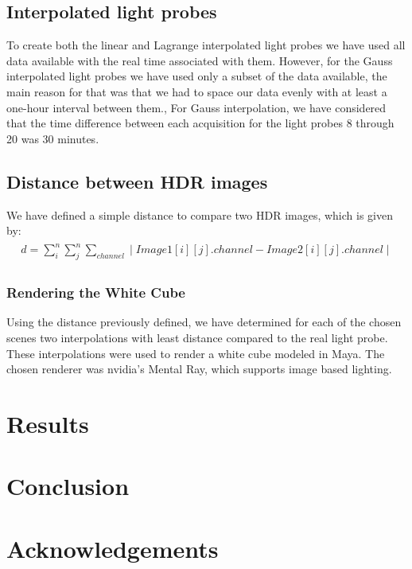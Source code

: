 \documentclass[conference]{acmsiggraph}
\begin{document}
\subsection{Interpolated light probes}
	To create both the linear and Lagrange interpolated light probes we have used all data available with the real time associated with them. 
However, for the Gauss interpolated light probes we have used only a subset of the data available, the main reason for that was that we had to space our data evenly with at least a one-hour interval between them., For Gauss interpolation, we have considered that the time difference between each acquisition for the light probes 8 through 20 was 30 minutes.

\subsection{Distance between HDR images}
	We have defined a simple distance to compare two HDR images, which is given by:
\begin{align}
\begin{split}
	d = \sum\limits_{i}^{n} \sum\limits_{j}^{n} \sum\limits_{channel} \mid Image1[i][j].channel - Image2[i][j].channel \mid
\end{split}
\end{align}

\subsubsection{Rendering the White Cube}
	Using the distance previously defined, we have determined for each of the chosen scenes two interpolations with least distance compared to the real light probe. These interpolations were used to render a white cube modeled in Maya. The chosen renderer was nvidia’s Mental Ray, which supports image based lighting.

\section{Results}

\section{Conclusion}

\section*{Acknowledgements}



\end{document}
